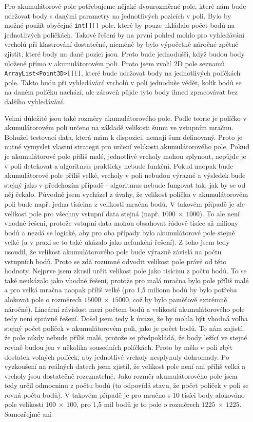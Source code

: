 \documentclass[11pt,twoside,a4paper]{book}
\begin{document}
Pro akumulátorové pole potřebujeme nějaké dvourozměrné pole, které nám bude udržovat body  s danými parametry na jednotlivých pozicích v poli. Bylo by možné použít obyčejné \verb|int[][]| pole, které by pouze ukládalo počet bodů na jednotlivých políčkách. Takové řešení by na první pohled mohlo pro vyhledávání vrcholů při klastrování dostatečné, nicméně by bylo výpočetně náročné zpětně zjistit, které body na dané pozici jsou. Proto bude jednodušší, když budou body uložené přímo v akumulátorovém poli. Proto jsem zvolil 2D pole seznamů \verb|ArrayList<Point3D>[][]|, které bude udržovat body na jednotlivých políčkách pole. Takto budu při vyhledávání vrcholů v poli jednoduše vědět, kolik bodů se na daném políčku nachází, ale zároveň půjde tyto body ihned zpracovávat bez dalšího vyhledávání. 

Velmi důležité jsou také rozměry akumulátorového pole. Podle teorie je políčko v akumulátorovém poli určeno na základě velikosti šumu ve vstupním mračnu. Bohužel testovací data, která mám k dispozici, nemají šum definovaný. Proto je nutné vymyslet vlastní strategii pro určení velikosti akumulátorového pole. Pokud je akumulátorové pole příliš malé, jednotlivé vrcholy mohou splynout, nepůjde je v poli detekovat a algoritmus prakticky nebude funkční. Pokud naopak bude akumulátorové pole příliš velké, vrcholy v poli nebudou výrazné a výsledek bude stejný jako v předchozím případě - algoritmus nebude fungovat tak, jak by se od něj čekalo. Původně jsem vycházel z úvahy, že velikost políčka v akumulátorovém poli bude např. jedna tisícina z velikosti mračna bodů. V takovém případě je ale velikost pole pro všechny vstupní data stejná (např. $1000~\times~1000$). To ale není vhodné řešení, protože vstupní data mohou obsahovat řádově tisíce až miliony bodů a nezdá se logické, aby pro oba případy bylo akumulátorové pole stejně velké (a v praxi se to také ukázalo jako nefunkční řešení). Z toho jsem tedy usoudil, že velikost akumulátorového pole bude výrazně závislá na počtu vstupních bodů. Proto se zdá rozumné odvodit velikost pole právě od této hodnoty. Nejprve jsem zkusil určit velikost pole jako tisícinu z počtu bodů. To se také neukázalo jako vhodné řešení, protože pro malá mračna bylo pole příliš malé a pro velká mračna naopak příliš velké (pro 1,5 milionu bodů by bylo potřeba alokovat pole o rozměrech $15000~\times~15000$, což by bylo paměťově extrémně náročné). Lineární závislost mezi počtem bodů a velikostí akumulátorového pole tedy není správné řešení. Došel jsem tedy k úvaze, že by mohla být vhodná volba stejný počet políček v akumulátorovém poli, jako je počet bodů. To nám zajistí, že pole nikdy nebude příliš malé, protože se předpokládá, že body ležící ve stejné rovině budou jen v několika sousedních políčkách. Proto by mělo v poli zbýt dostatek volných políček, aby jednotlivé vrcholy nesplynuly dohromady. Po vyzkoušení na reálných datech jsem zjistil, že velikost pole není ani příliš velká a vrcholy jsou dostatečně rozeznatelné. Jako rozměr akumulátorového pole jsem tedy určil odmocninu z počtu bodů (to odpovídá stavu, že počet políček v poli se rovná počtu bodů). V takovém případě je pro mračno s 10 tisíci body alokováno pole velikosti $100~\times~100$, pro 1,5 mil bodů je to pole o rozměrech $1225~\times~1225$. Samozřejmě ani 
\end{document}
